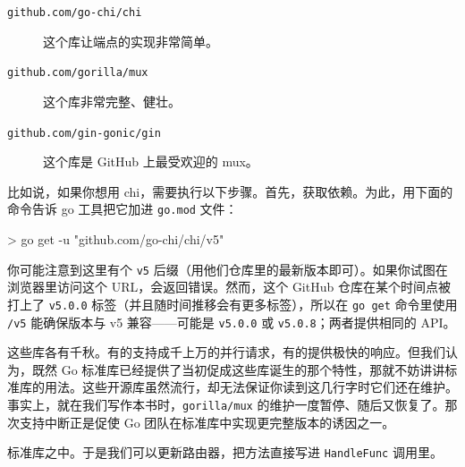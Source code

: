 \begin{description}
  \item[\texttt{github.com/go-chi/chi}] 这个库让端点的实现非常简单。
  \item[\texttt{github.com/gorilla/mux}] 这个库非常完整、健壮。
  \item[\texttt{github.com/gin-gonic/gin}] 这个库是 GitHub 上最受欢迎的 mux。
\end{description}

比如说，如果你想用 chi，需要执行以下步骤。首先，获取依赖。为此，用下面的命令告诉 go 工具把它加进 \texttt{go.mod} 文件：

\begin{shellcode}[]
> go get -u "github.com/go-chi/chi/v5"
\end{shellcode}

你可能注意到这里有个 \texttt{v5} 后缀（用他们仓库里的最新版本即可）。如果你试图在浏览器里访问这个 URL，会返回错误。然而，这个 GitHub 仓库在某个时间点被打上了 \texttt{v5.0.0} 标签（并且随时间推移会有更多标签），所以在 \texttt{go get} 命令里使用 \texttt{/v5} 能确保版本与 v5 兼容——可能是 \texttt{v5.0.0} 或 \texttt{v5.0.8}；两者提供相同的 API。

这些库各有千秋。有的支持成千上万的并行请求，有的提供极快的响应。但我们认为，既然 Go 标准库已经提供了当初促成这些库诞生的那个特性，那就不妨讲讲标准库的用法。这些开源库虽然流行，却无法保证你读到这几行字时它们还在维护。事实上，就在我们写作本书时，\texttt{gorilla/mux} 的维护一度暂停、随后又恢复了。那次支持中断正是促使 Go 团队在标准库中实现更完整版本的诱因之一。

标准库之中。于是我们可以更新路由器，把方法直接写进 \texttt{HandleFunc} 调用里。


